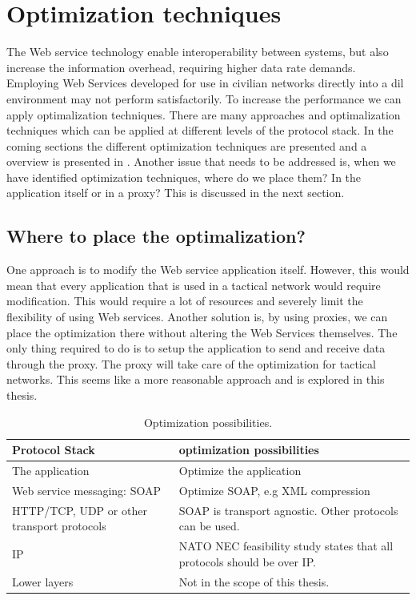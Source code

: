 \documentclass[USenglish]{ifimaster}
\begin{document}
\section{Optimization techniques}
The Web service technology enable interoperability between systems, but also
increase the information overhead, requiring higher data rate demands. Employing
Web Services developed for use in civilian networks directly into a \gls{dil}
environment may not perform satisfactorily. To increase the performance we can
apply optimalization techniques. There are many approaches and optimalization
techniques which can be applied at different levels of the protocol stack. In
the coming sections the different optimization techniques are presented and a
overview is presented in . Another issue
that needs to be addressed is, when we have identified optimization techniques,
where do we place them? In the application itself or in a proxy? This is
discussed in the next section.

\subsection{Where to place the optimalization?}
One approach is to modify the Web service application itself. However, this
would mean that every application that is used in a tactical network would
require modification. This would require a lot of resources and severely limit
the flexibility of using Web services. Another solution is, by using proxies, we
can place the optimization there without altering the Web Services themselves.
The only thing required to do is to setup the application to send and receive
data through the proxy. The proxy will take care of the optimization for
tactical networks. This seems like a more reasonable approach and is explored in
this thesis.


\begin{table}[h]
\begin{tabularx}{\textwidth}{| X | X |}
\hline
  \textbf{Protocol Stack} & \textbf{optimization possibilities} \\ \hline
  The application & Optimize the application\\ \hline
  Web service messaging: SOAP & Optimize SOAP, e.g XML compression \\ \hline
  HTTP/TCP, UDP or other transport protocols & SOAP is transport agnostic. Other
  protocols can be used. \\ \hline
  IP & NATO NEC feasibility study states that all protocols should be over IP. \\
  \hline
  Lower layers & Not in the scope of this thesis. \\ \hline
\end{tabularx}
\caption{Optimization possibilities.} \label{table:optimalization-overview}
\end{table}
\end{document}
